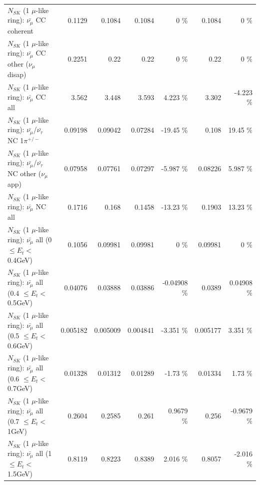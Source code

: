 \begin{table}
\begin{tabular}{| l | r | r | r  r | r  r |}
                       $N_{SK}$ (1 $\mu$-like ring): $\bar{\nu_\mu}$ CC coherent &          0.1129 &          0.1084 &          0.1084 &        0 \%  &          0.1084 &        0 \%  \\ 
        $N_{SK}$ (1 $\mu$-like ring): $\bar{\nu_\mu}$ CC other ($\nu_\mu$ disap) &          0.2251 &            0.22 &            0.22 &        0 \%  &            0.22 &        0 \%  \\ 
                          $N_{SK}$ (1 $\mu$-like ring): $\bar{\nu_{\mu}}$ CC all &           3.562 &           3.448 &           3.593 &    4.223 \%  &           3.302 &   -4.223 \%  \\ 
\hline
  $N_{SK}$ (1 $\mu$-like ring): $\bar{\nu_\mu}$/$\bar{\nu_\tau}$ NC 1$\pi^{+/-}$ &         0.09198 &         0.09042 &         0.07284 &   -19.45 \%  &           0.108 &    19.45 \%  \\ 
$N_{SK}$ (1 $\mu$-like ring): $\bar{\nu_\mu}$/$\bar{\nu_\tau}$ NC other ($\nu_\mu$ app) &         0.07958 &         0.07761 &         0.07297 &   -5.987 \%  &         0.08226 &    5.987 \%  \\ 
                          $N_{SK}$ (1 $\mu$-like ring): $\bar{\nu_{\mu}}$ NC all &          0.1716 &           0.168 &          0.1458 &   -13.23 \%  &          0.1903 &    13.23 \%  \\ 
\hline
   $N_{SK}$ (1 $\mu$-like ring): $\bar{\nu_{\mu}}$ all (0 $\leq E_{t} <$ 0.4GeV) &          0.1056 &         0.09981 &         0.09981 &        0 \%  &         0.09981 &        0 \%  \\ 
 $N_{SK}$ (1 $\mu$-like ring): $\bar{\nu_{\mu}}$ all (0.4 $\leq E_{t} <$ 0.5GeV) &         0.04076 &         0.03888 &         0.03886 & -0.04908 \%  &          0.0389 &  0.04908 \%  \\ 
 $N_{SK}$ (1 $\mu$-like ring): $\bar{\nu_{\mu}}$ all (0.5 $\leq E_{t} <$ 0.6GeV) &        0.005182 &        0.005009 &        0.004841 &   -3.351 \%  &        0.005177 &    3.351 \%  \\ 
 $N_{SK}$ (1 $\mu$-like ring): $\bar{\nu_{\mu}}$ all (0.6 $\leq E_{t} <$ 0.7GeV) &         0.01328 &         0.01312 &         0.01289 &    -1.73 \%  &         0.01334 &     1.73 \%  \\ 
   $N_{SK}$ (1 $\mu$-like ring): $\bar{\nu_{\mu}}$ all (0.7 $\leq E_{t} <$ 1GeV) &          0.2604 &          0.2585 &           0.261 &   0.9679 \%  &           0.256 &  -0.9679 \%  \\ 
   $N_{SK}$ (1 $\mu$-like ring): $\bar{\nu_{\mu}}$ all (1 $\leq E_{t} <$ 1.5GeV) &          0.8119 &          0.8223 &          0.8389 &    2.016 \%  &          0.8057 &   -2.016 \%  \\ 

\end{tabular}
\end{table}
